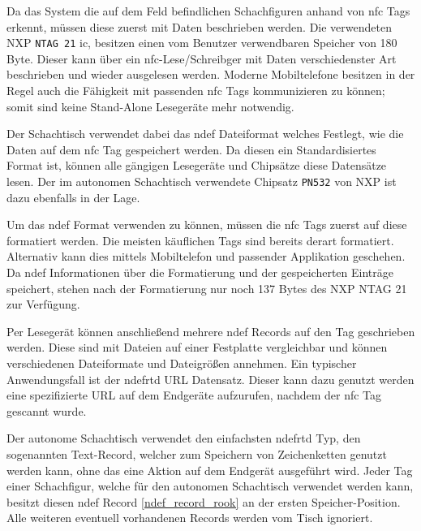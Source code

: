 Da das System die auf dem Feld befindlichen Schachfiguren anhand von
\gls{nfc} Tags erkennt, müssen diese zuerst mit Daten beschrieben
werden. Die verwendeten NXP
\passthrough{\lstinline!NTAG 21!}\cite{nxpntag21} \gls{ic}, besitzen
einen vom Benutzer verwendbaren Speicher von 180 Byte. Dieser kann über
ein \gls{nfc}-Lese/Schreibger mit Daten verschiedenster Art beschrieben
und wieder ausgelesen werden. Moderne Mobiltelefone besitzen in der
Regel auch die Fähigkeit mit passenden \gls{nfc} Tags kommunizieren zu
können; somit sind keine Stand-Alone Lesegeräte mehr notwendig.

Der Schachtisch verwendet dabei das \gls{ndef} Dateiformat welches
Festlegt, wie die Daten auf dem \gls{nfc} Tag gespeichert werden. Da
diesen ein Standardisiertes Format ist, können alle gängigen Lesegeräte
und Chipsätze diese Datensätze lesen. Der im autonomen Schachtisch
verwendete Chipsatz \passthrough{\lstinline!PN532!} von NXP ist dazu
ebenfalls in der Lage.

Um das \gls{ndef} Format verwenden zu können, müssen die \gls{nfc} Tags
zuerst auf diese formatiert werden. Die meisten käuflichen Tags sind
bereits derart formatiert. Alternativ kann dies mittels Mobiltelefon und
passender Applikation geschehen. Da \gls{ndef} Informationen über die
Formatierung und der gespeicherten Einträge speichert, stehen nach der
Formatierung nur noch 137 Bytes des NXP NTAG 21 zur Verfügung.

Per Lesegerät können anschließend mehrere \gls{ndef} Records auf den Tag
geschrieben werden. Diese sind mit Dateien auf einer Festplatte
vergleichbar und können verschiedenen Dateiformate und Dateigrößen
annehmen. Ein typischer Anwendungsfall ist der \gls{ndefrtd} URL
Datensatz. Dieser kann dazu genutzt werden eine spezifizierte URL auf
dem Endgeräte aufzurufen, nachdem der \gls{nfc} Tag gescannt wurde.
\cite{nordicnfclibndef}

Der autonome Schachtisch verwendet den einfachsten \gls{ndefrtd} Typ,
den sogenannten Text-Record, welcher zum Speichern von Zeichenketten
genutzt werden kann, ohne das eine Aktion auf dem Endgerät ausgeführt
wird. Jeder Tag einer Schachfigur, welche für den autonomen Schachtisch
verwendet werden kann, besitzt diesen \gls{ndef} Record
\ref{ndef_record_rook} an der ersten Speicher-Position. Alle weiteren
eventuell vorhandenen Records werden vom Tisch ignoriert.
\cite{nordicnfclib}

